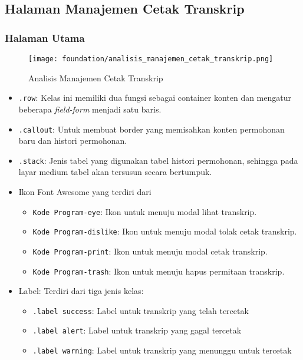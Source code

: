 \subsection{Halaman Manajemen Cetak Transkrip}
\subsubsection{Halaman Utama}
\begin{figure} [H]
	\centering  
	\texttt{[image: foundation/analisis\_manajemen\_cetak\_transkrip.png]}
	\caption{Analisis Manajemen Cetak Transkrip} 
\end{figure}
\begin{itemize}
	\item \texttt{.row}: Kelas ini memiliki dua fungsi sebagai container konten dan mengatur beberapa \textit{field-form} menjadi satu baris. 
	\item \texttt{.callout}: Untuk membuat border yang memisahkan konten permohonan baru dan histori permohonan.
	\item \texttt{.stack}: Jenis tabel yang digunakan tabel histori permohonan, sehingga pada layar medium tabel akan tersusun secara bertumpuk.
	\item Ikon Font Awesome yang terdiri dari 
	\begin{itemize}
		\item \texttt{Kode Program-eye}: Ikon untuk menuju modal lihat transkrip.
		\item \texttt{Kode Program-dislike}: Ikon untuk menuju modal tolak cetak transkrip.
		\item \texttt{Kode Program-print}: Ikon untuk menuju modal cetak transkrip.
		\item \texttt{Kode Program-trash}: Ikon untuk menuju hapus permitaan transkrip.
	\end{itemize}
	\item Label: Terdiri dari tiga jenis kelas:
	\begin{itemize}
		\item \texttt{.label success}: Label untuk transkrip yang telah tercetak
		\item \texttt{.label alert}: Label untuk transkrip yang gagal tercetak
		\item \texttt{.label warning}: Label untuk transkrip yang menunggu untuk tercetak
	\end{itemize}
	
\end{itemize}
